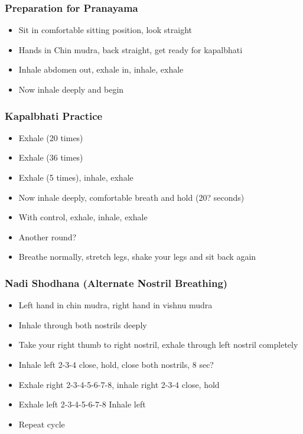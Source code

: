 \begin{frame}[fragile]\frametitle{Preparation for Pranayama}
\begin{itemize}
    \item Sit in comfortable sitting position, look straight
    \item Hands in Chin mudra, back straight, get ready for kapalbhati
    \item Inhale abdomen out, exhale in, inhale, exhale
    \item Now inhale deeply and begin
\end{itemize}
\end{frame}

\begin{frame}[fragile]\frametitle{Kapalbhati Practice}
\begin{itemize}
    \item Exhale (20 times)
    \item Exhale (36 times)
    \item Exhale (5 times), inhale, exhale
    \item Now inhale deeply, comfortable breath and hold (20? seconds)
    \item With control, exhale, inhale, exhale
    \item Another round?
    \item Breathe normally, stretch legs, shake your legs and sit back again
\end{itemize}
\end{frame}

\begin{frame}[fragile]\frametitle{Nadi Shodhana (Alternate Nostril Breathing)}
\begin{itemize}
    \item Left hand in chin mudra, right hand in vishnu mudra
    \item Inhale through both nostrils deeply
    \item Take your right thumb to right nostril, exhale through left nostril completely
    \item Inhale left 2-3-4 close, hold, close both nostrils, 8 sec?
    \item Exhale right 2-3-4-5-6-7-8, inhale right 2-3-4 close, hold
    \item Exhale left 2-3-4-5-6-7-8 Inhale left
    \item Repeat cycle
\end{itemize}
\end{frame}

